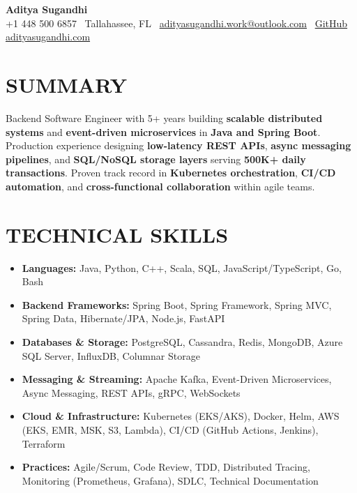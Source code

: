 \documentclass[letterpaper,10pt]{article}
\newcommand{\resumeItem}[1]{\item\small #1}
\begin{document}
\begin{center}
{\huge\textbf{Aditya Sugandhi}} \\
+1 448 500 6857 \textbar\ \textcolor{metablue}{Tallahassee, FL} \textbar\
\href{mailto:adityasugandhi.work@outlook.com}{adityasugandhi.work@outlook.com} \textbar\
\href{https://github.com/adityasugandhi}{GitHub}
\textbar \href{https://adityasugandhi.com}{adityasugandhi.com}
\end{center}
\vspace{-12pt}

\section{\textcolor{metablue}{SUMMARY}}
\small
\vspace{-6pt}
Backend Software Engineer with 5+ years building \textbf{scalable distributed systems} and \textbf{event-driven microservices} in \textbf{Java and Spring Boot}. Production experience designing \textbf{low-latency REST APIs}, \textbf{async messaging pipelines}, and \textbf{SQL/NoSQL storage layers} serving \textbf{500K+ daily transactions}. Proven track record in \textbf{Kubernetes orchestration}, \textbf{CI/CD automation}, and \textbf{cross-functional collaboration} within agile teams.

\vspace{-9pt}

\section{\textcolor{metablue}{TECHNICAL SKILLS}}
\vspace{-5pt}
\small
\begin{itemize}
\resumeItem{\textbf{Languages:} Java, Python, C++, Scala, SQL, JavaScript/TypeScript, Go, Bash}
\resumeItem{\textbf{Backend Frameworks:} Spring Boot, Spring Framework, Spring MVC, Spring Data, Hibernate/JPA, Node.js, FastAPI}
\resumeItem{\textbf{Databases \& Storage:} PostgreSQL, Cassandra, Redis, MongoDB, Azure SQL Server, InfluxDB, Columnar Storage}
\resumeItem{\textbf{Messaging \& Streaming:} Apache Kafka, Event-Driven Microservices, Async Messaging, REST APIs, gRPC, WebSockets}
\resumeItem{\textbf{Cloud \& Infrastructure:} Kubernetes (EKS/AKS), Docker, Helm, AWS (EKS, EMR, MSK, S3, Lambda), CI/CD (GitHub Actions, Jenkins), Terraform}
\resumeItem{\textbf{Practices:} Agile/Scrum, Code Review, TDD, Distributed Tracing, Monitoring (Prometheus, Grafana), SDLC, Technical Documentation}
\end{itemize}
\vspace{-10pt}
\end{document}
